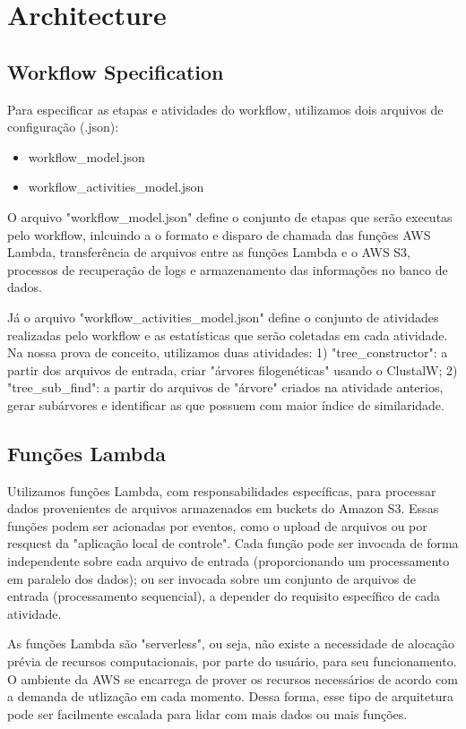 \section{Architecture}
\label{sec:architecture}


\subsection{Workflow Specification}
Para especificar as etapas e atividades do workflow, utilizamos dois arquivos de configuração (.json):
\begin{itemize}
    \item workflow\_model.json
    \item workflow\_activities\_model.json
\end{itemize}

O arquivo "workflow\_model.json" define o conjunto de etapas que serão executas pelo workflow, inlcuindo a o formato e disparo de chamada das funções AWS Lambda, transferência de arquivos entre as funções Lambda e o AWS S3, processos de recuperação de logs e armazenamento das informações no banco de dados.

Já o arquivo "workflow\_activities\_model.json" define o conjunto de atividades realizadas pelo workflow e as estatísticas que serão coletadas em cada atividade. Na nossa prova de conceito, utilizamos duas atividades: 1) "tree\_constructor": a partir dos arquivos de entrada, criar "árvores filogenéticas" usando o ClustalW; 2) "tree\_sub\_find": a partir do arquivos de "árvore" criados na atividade anterios, gerar subárvores e identificar as que possuem com maior índice de similaridade.



\subsection{Funções Lambda}
Utilizamos funções Lambda, com responsabilidades específicas, para processar dados provenientes de arquivos armazenados em buckets do Amazon S3. Essas funções podem ser acionadas por eventos, como o upload de arquivos ou por resquest da "aplicação local de controle". Cada função pode ser invocada de forma independente sobre cada arquivo de entrada (proporcionando um processamento em paralelo dos dados); ou ser invocada sobre um conjunto de arquivos de entrada (processamento sequencial), a depender do requisito específico de cada atividade.

As funções Lambda são "serverless", ou seja, não existe a necessidade de alocação prévia de recursos computacionais, por parte do usuário, para seu funcionamento. O ambiente da AWS se encarrega de prover os recursos necessários de acordo com a demanda de utlização em cada momento. Dessa forma, esse tipo de arquitetura pode ser facilmente escalada para lidar com mais dados ou mais funções.



